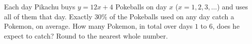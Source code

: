 Each day Pikachu buys $y=12x+4$ Pokeballs on day $x$ ($x=1,2,3,\dots$) and uses all of them that day. Exactly $30\%$ of the Pokeballs used on any day catch a Pokemon, on average. How many Pokemon, in total over days $1$ to $6$, does he expect to catch? Round to the nearest whole number.
